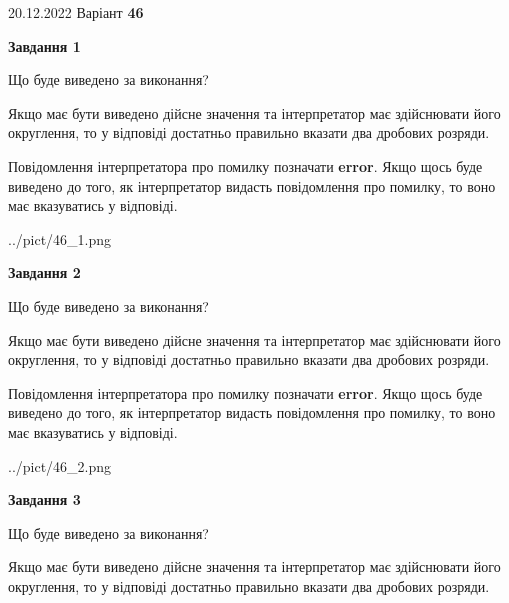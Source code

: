 \documentclass[12pt, ukrainian]{article}
\begin{document}
{20.12.2022 Варіант \No \textbf { 46 }\par}
{
\begin {Large}

{\begin {center}\textbf{Завдання 1}\end {center}}\par
Що буде виведено за виконання? \par

Якщо має бути виведено дійсне значення та інтерпретатор має здійснювати його округлення, 
то у відповіді достатньо правильно вказати два дробових розряди.

Повідомлення інтерпретатора про помилку позначати \textbf{error}.
Якщо щось буде виведено до того, як інтерпретатор видасть повідомлення про помилку, 
то воно має вказуватись у відповіді. \par

\begin{center}
	{../pict/46_1.png}
\end{center}
\newpage

{\begin {center}\textbf{Завдання 2}\end {center}}\par
Що буде виведено за виконання? \par

Якщо має бути виведено дійсне значення та інтерпретатор має здійснювати його округлення, 
то у відповіді достатньо правильно вказати два дробових розряди.

Повідомлення інтерпретатора про помилку позначати \textbf{error}.
Якщо щось буде виведено до того, як інтерпретатор видасть повідомлення про помилку, 
то воно має вказуватись у відповіді. \par

\begin{center}
	{../pict/46_2.png}
\end{center}
\newpage

{\begin {center}\textbf{Завдання 3}\end {center}}\par
Що буде виведено за виконання? \par

Якщо має бути виведено дійсне значення та інтерпретатор має здійснювати його округлення, 
то у відповіді достатньо правильно вказати два дробових розряди.


\end{Large}}
\end{document}
